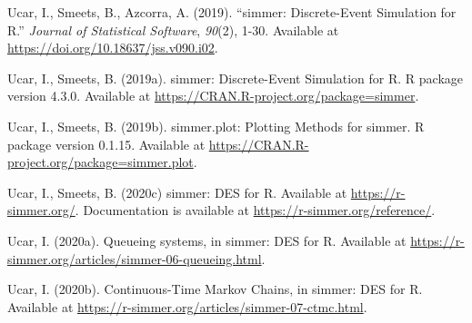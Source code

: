 \documentclass[
]{book}
\theoremstyle{definition}
\theoremstyle{definition}
\theoremstyle{definition}
\theoremstyle{definition}
\theoremstyle{remark}
\begin{document}
Ucar, I., Smeets, B., Azcorra, A. (2019). ``simmer: Discrete-Event
Simulation for R.'' \emph{Journal of Statistical Software}, \emph{90}(2), 1-30.
Available at \url{https://doi.org/10.18637/jss.v090.i02}.

Ucar, I., Smeets, B. (2019a). simmer: Discrete-Event Simulation for R. R package version 4.3.0. Available at \url{https://CRAN.R-project.org/package=simmer}.

Ucar, I., Smeets, B. (2019b). simmer.plot: Plotting Methods for simmer. R package version 0.1.15. Available at \url{https://CRAN.R-project.org/package=simmer.plot}.

Ucar, I., Smeets, B. (2020c) simmer: DES for R. Available at \url{https://r-simmer.org/}. Documentation is available at \url{https://r-simmer.org/reference/}.

Ucar, I. (2020a). Queueing systems, in simmer: DES for R. Available at \url{https://r-simmer.org/articles/simmer-06-queueing.html}.

Ucar, I. (2020b). Continuous-Time Markov Chains, in simmer: DES for R. Available at \url{https://r-simmer.org/articles/simmer-07-ctmc.html}.

  
\end{document}
